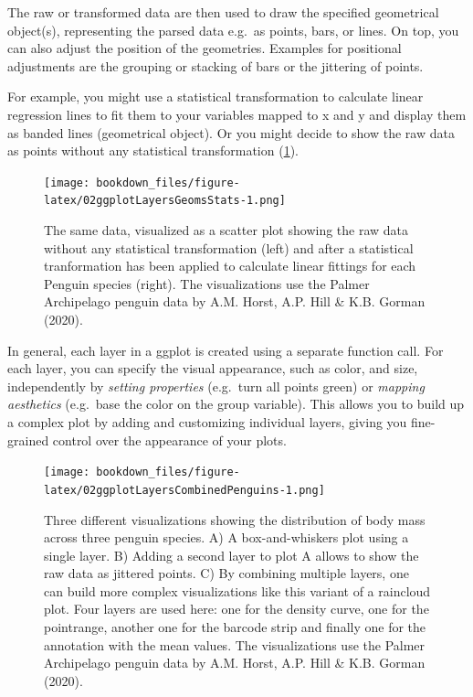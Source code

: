 \documentclass[
]{krantz}
\begin{document}
The raw or transformed data are then used to draw the specified geometrical object(s), representing the parsed data e.g.~as points, bars, or lines. On top, you can also adjust the position of the geometries. Examples for positional adjustments are the grouping or stacking of bars or the jittering of points.

For example, you might use a statistical transformation to calculate linear regression lines to fit them to your variables mapped to x and y and display them as banded lines (geometrical object). Or you might decide to show the raw data as points without any statistical transformation (\ref{fig:02ggplotLayersGeomsStats}).

\begin{figure}
\centering
\texttt{[image: bookdown\_files/figure-latex/02ggplotLayersGeomsStats-1.png]}
\caption{\label{fig:02ggplotLayersGeomsStats}The same data, visualized as a scatter plot showing the raw data without any statistical transformation (left) and after a statistical tranformation has been applied to calculate linear fittings for each Penguin species (right). The visualizations use the Palmer Archipelago penguin data by A.M. Horst, A.P. Hill \& K.B. Gorman (2020).}
\end{figure}

In general, each layer in a ggplot is created using a separate function call. For each layer, you can specify the visual appearance, such as color, and size, independently by \emph{setting properties} (e.g.~turn all points green) or \emph{mapping aesthetics} (e.g.~base the color on the group variable). This allows you to build up a complex plot by adding and customizing individual layers, giving you fine-grained control over the appearance of your plots.

\begin{figure}
\centering
\texttt{[image: bookdown\_files/figure-latex/02ggplotLayersCombinedPenguins-1.png]}
\caption{\label{fig:02ggplotLayersCombinedPenguins}Three different visualizations showing the distribution of body mass across three penguin species. A) A box-and-whiskers plot using a single layer. B) Adding a second layer to plot A allows to show the raw data as jittered points. C) By combining multiple layers, one can build more complex visualizations like this variant of a raincloud plot. Four layers are used here: one for the density curve, one for the pointrange, another one for the barcode strip and finally one for the annotation with the mean values. The visualizations use the Palmer Archipelago penguin data by A.M. Horst, A.P. Hill \& K.B. Gorman (2020).}
\end{figure}
\end{document}
